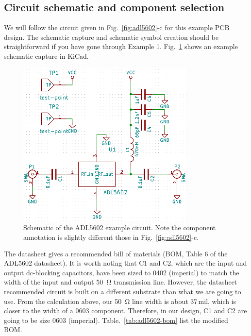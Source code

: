 \documentclass[12pt,letterpaper]{scrartcl}
\begin{document}
\subsection{Circuit schematic and component selection}

We will follow the circuit given in Fig.~\ref{fig:adl5602}-c for this example PCB design. The schematic capture and schematic symbol creation should be straightforward if you have gone through Example 1. Fig.~\ref{fig:example2-schematic} shows an example schematic capture in KiCad. 

\begin{figure}[ph]
	\centering
	\includegraphics[width=3.5in]{example2-schematic}
	\caption{Schematic of the ADL5602 example circuit. Note the component annotation is slightly different those in Fig.~\ref{fig:adl5602}-c.}
	\label{fig:example2-schematic}
\end{figure}

The datasheet gives a recommended bill of materials (BOM, Table 6 of the ADL5602 datasheet). It is worth noting that C1 and C2, which are the input and output dc-blocking capacitors, have been sized to 0402 (imperial) to match the width of the input and output \SI{50}{\ohm} transmission line. However, the datasheet recommended circuit is built on a different substrate than what we are going to use. From the calculation above, our \SI{50}{\ohm} line width is about 37\,mil, which is closer to the width of a 0603 component. Therefore, in our design, C1 and C2 are going to be size 0603 (imperial). Table.~\ref{tab:adl5602-bom} list the modified BOM. 
\end{document}
